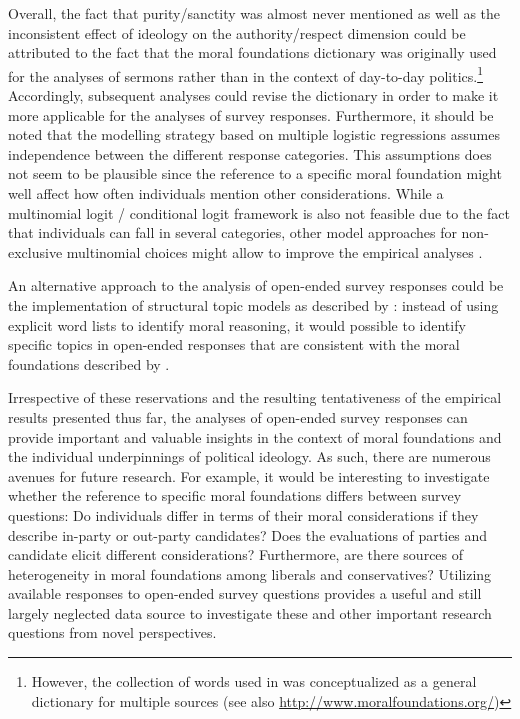 \documentclass[12pt]{article}
\begin{document}
Overall, the fact that purity/sanctity was almost never mentioned as well as the inconsistent effect of ideology on the authority/respect dimension could be attributed to the fact that the moral foundations dictionary was originally used for the analyses of sermons rather than in the context of day-to-day politics.\footnote{However, the collection of words used in \citet{graham2009liberals} was conceptualized as a general dictionary for multiple sources (see also \url{http://www.moralfoundations.org/})} Accordingly, subsequent analyses could revise the dictionary in order to make it more applicable for the analyses of survey responses. Furthermore, it should be noted that the modelling strategy based on multiple logistic regressions assumes independence between the different response categories. This assumptions does not seem to be plausible since the reference to a specific moral foundation might well affect how often individuals mention other considerations. While a multinomial logit / conditional logit framework is also not feasible due to the fact that individuals can fall in several categories, other model approaches for non-exclusive multinomial choices might allow to improve the empirical analyses \citep[see for example][]{gilbert2007models}.

An alternative approach to the analysis of open-ended survey responses could be the implementation of structural topic models as described by \citet{roberts2014structural}: instead of using explicit word lists to identify moral reasoning, it would possible to identify specific topics in open-ended responses that are consistent with the moral foundations described by \citet{haidt2008moral} \citep[see also][]{lin2008joint}.

Irrespective of these reservations and the resulting tentativeness of the empirical results presented thus far, the analyses of open-ended survey responses can provide important and valuable insights in the context of moral foundations and the individual underpinnings of political ideology. As such, there are numerous avenues for future research. For example, it would be interesting to investigate whether the reference to specific moral foundations differs between survey questions: Do individuals differ in terms of their moral considerations if they describe in-party or out-party candidates? Does the evaluations of parties and candidate elicit different considerations? Furthermore, are there sources of heterogeneity in moral foundations among liberals and conservatives? Utilizing available responses to open-ended survey questions provides a useful and still largely neglected data source to investigate these and other important research questions from novel perspectives.
\end{document}
